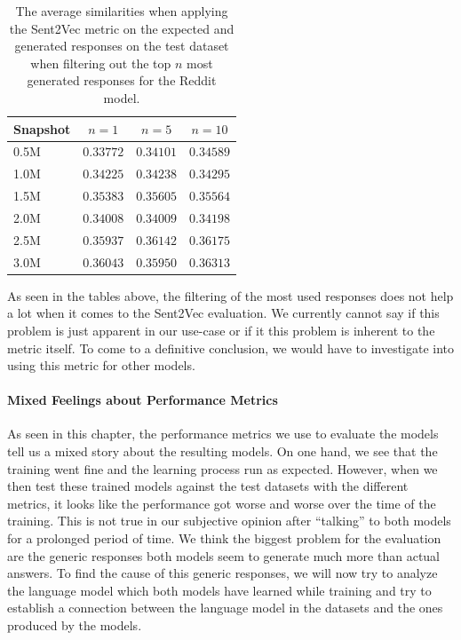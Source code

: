\begin{table}[H]
	\centering
	\begin{adjustbox}{max width=\textwidth}
		\begin{tabular}{lccc}
			\toprule
			Snapshot & $n = 1$ & $n = 5$ & $n = 10$\\
			\midrule
			0.5M & $0.33772$ & $0.34101$ & $0.34589$\\
			1.0M & $0.34225$ & $0.34238$ & $0.34295$\\
			1.5M & $0.35383$ & $0.35605$ & $0.35564$\\
			2.0M & $0.34008$ & $0.34009$ & $0.34198$\\
			2.5M & $0.35937$ & $0.36142$ & $0.36175$\\
			3.0M & $0.36043$ & $0.35950$ & $0.36313$\\
			\bottomrule
		\end{tabular}
	\end{adjustbox}
	\caption{The average similarities when applying the Sent2Vec metric on the expected and generated responses on the test dataset when filtering out the top $n$ most generated responses for the Reddit model.}
	\label{results:sent2vec:reddit:top_n_results_table}
\end{table}

As seen in the tables above, the filtering of the most used responses does not help a lot when it comes to the Sent2Vec evaluation. We currently cannot say if this problem is just apparent in our use-case or if it this problem is inherent to the metric itself. To come to a definitive conclusion, we would have to investigate into using this metric for other models.

\paragraph{Mixed Feelings about Performance Metrics} As seen in this chapter, the performance metrics we use to evaluate the models tell us a mixed story about the resulting models. On one hand, we see that the training went fine and the learning process run as expected. However, when we then test these trained models against the test datasets with the different metrics, it looks like the performance got worse and worse over the time of the training. This is not true in our subjective opinion after ``talking'' to both models for a prolonged period of time. We think the biggest problem for the evaluation are the generic responses both models seem to generate much more than actual answers. To find the cause of this generic responses, we will now try to analyze the language model which both models have learned while training and try to establish a connection between the language model in the datasets and the ones produced by the models.

